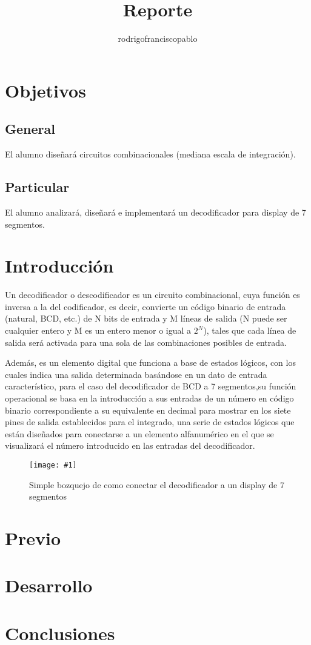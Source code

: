 \documentclass{mylib/reporteConCalif}
\title{Reporte}
\author{rodrigofranciscopablo }
\newcommand{\insertImage}[3]{
	\begin{figure}[H]
		\centering
		\texttt{[image: \#1]}
		\caption{#2}
	\end{figure}
}
\begin{document}
\coverPage

\section{Objetivos}

\subsection{General}

El alumno diseñará circuitos combinacionales (mediana escala de integración).

\subsection{Particular}

El alumno analizará, diseñará e implementará un decodificador para display de 7 segmentos.

\section{Introducción}

Un decodificador o descodificador es un circuito combinacional, cuya función es inversa a la del codificador, es decir, convierte un código binario de entrada (natural, BCD, etc.) de N bits de entrada y M líneas de salida (N puede ser cualquier entero y M es un entero menor o igual a $2^N$), tales que cada línea de salida será activada para una sola de las combinaciones posibles de entrada.

Además, es un elemento digital que funciona a base de estados lógicos, con los cuales indica una salida determinada basándose en un dato de entrada característico, para el caso del decodificador de BCD a 7 segmentos,su función operacional se basa en la introducción a sus entradas de un número en código binario correspondiente a su equivalente en decimal para mostrar en los siete pines de salida establecidos para el integrado, una serie de estados lógicos que están diseñados para conectarse a un elemento alfanumérico en el que se visualizará el número introducido en las entradas del decodificador.

\insertImage{img/labdise_pract7/decoder_bcd}{Simple bozquejo de como conectar el decodificador a un display de 7 segmentos}{15}

\newpage
\section{Previo}

\newpage
\section{Desarrollo}



\section{Conclusiones}
\end{document}
